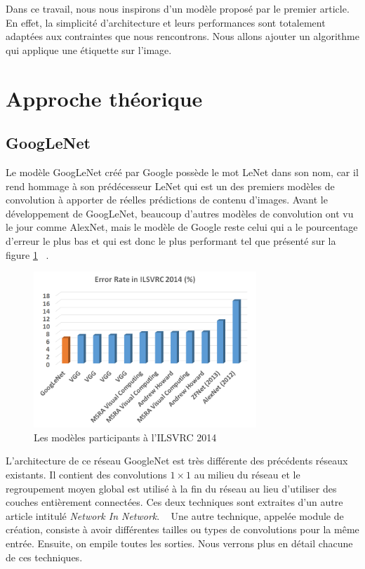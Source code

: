 \documentclass{article}
\begin{document}
Dans ce travail, nous nous inspirons d'un modèle proposé par le premier article.
En effet, la simplicité d’architecture et leurs performances sont totalement
adaptées aux contraintes que nous rencontrons. Nous allons ajouter un algorithme
qui applique une étiquette sur l'image.

\section{Approche théorique}

\subsection{GoogLeNet}
Le modèle GoogLeNet créé par Google possède le mot LeNet dans son nom, car il
rend hommage à son prédécesseur LeNet qui est un des premiers modèles de
convolution à apporter de réelles prédictions de contenu d’images. Avant le
développement de GoogLeNet,  beaucoup d’autres modèles de convolution ont vu le
jour comme AlexNet, mais le modèle de Google reste celui qui a le pourcentage
d’erreur le plus bas et qui est donc le plus performant tel que présenté
sur la figure \ref{2} ~\cite{tsang_2018}.

\begin{figure}[htbp]
    \includegraphics[width=8.4cm]{./figures/Figure1.png} 
    \caption{Les modèles participants à l'ILSVRC 2014}
    \label{2} 
\end{figure} 

L'architecture de ce réseau GoogleNet est très différente des précédents réseaux
existants. Il contient des convolutions $1\times 1$ au milieu du réseau et le
regroupement moyen global est utilisé à la fin du réseau au lieu d’utiliser des
couches entièrement connectées. Ces deux techniques sont extraites d’un autre
article intitulé \textit{Network In Network}. ~\cite{lin2013network} Une autre
technique, appelée module de création, consiste à avoir différentes tailles ou
types de convolutions pour la même entrée. Ensuite, on empile toutes les 
sorties. Nous verrons plus en détail chacune de ces techniques.
\end{document}
